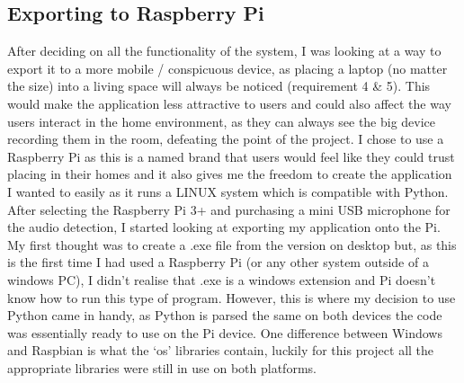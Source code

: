 \documentclass[a4paper,11pt]{report}
\begin{document}
\subsection{Exporting to Raspberry Pi}
After deciding on all the functionality of the system, I was looking at a way to export it to a more mobile / conspicuous device, as placing a laptop (no matter the size) into a living space will always be noticed (requirement 4 \& 5). This would make the application less attractive to users and could also affect the way users interact in the home environment, as they can always see the big device recording them in the room, defeating the point of the project. I chose to use a Raspberry Pi as this is a named brand that users would feel like they could trust placing in their homes and it also gives me the freedom to create the application I wanted to easily as it runs a LINUX system which is compatible with Python.\\

After selecting the Raspberry Pi 3+ and purchasing a mini USB microphone for the audio detection, I started looking at exporting my application onto the Pi. My first thought was to create a .exe file from the version on desktop but, as this is the first time I had used a Raspberry Pi (or any other system outside of a windows PC), I didn’t realise that .exe is a windows extension and Pi doesn’t know how to run this type of program. However, this is where my decision to use Python came in handy, as Python is parsed the same on both devices the code was essentially ready to use on the Pi device. One difference between Windows and Raspbian is what the ‘os’ libraries contain, luckily for this project all the appropriate libraries were still in use on both platforms.
\end{document}
